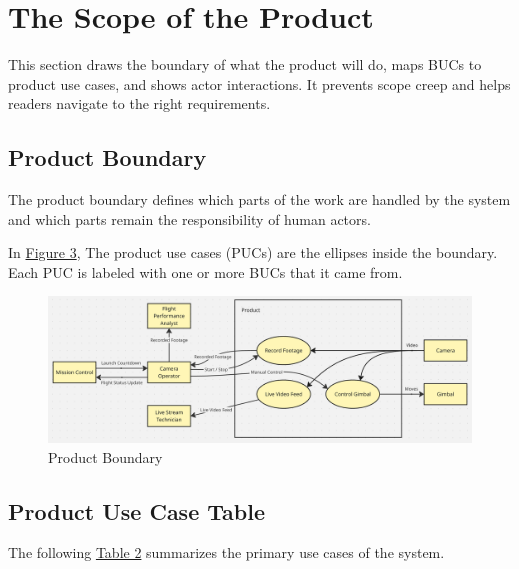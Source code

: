 \documentclass[12pt]{article}
\begin{document}
\section{The Scope of the Product}
This section draws the boundary of what the product will do, maps BUCs to
product use cases, and shows actor interactions. It prevents scope creep and
helps readers navigate to the right requirements.
\subsection{Product Boundary}

The product boundary defines which parts of the work are handled by the system
and which parts remain the responsibility of human actors.

In \hyperref[img:product-boundary]{Figure 3}, The product use cases (PUCs) are
the ellipses inside the boundary. Each PUC is labeled with one or more BUCs
that it came from.

\begin{figure}[H]
  \centering
  \includegraphics[width=\textwidth,height=\textheight,keepaspectratio]{../Images/product_boundary.png}
  \caption{Product Boundary}
  \label{img:product-boundary}
\end{figure}

\subsection{Product Use Case Table}

The following \hyperref[tab:product-use-case-table]{Table 2} summarizes the
primary use cases of the system.
\end{document}
